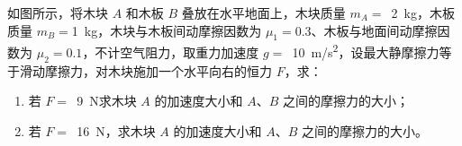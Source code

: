 如图所示，将木块 \(A\) 和木板 \(B\) 叠放在水平地面上，木块质量 \(m_A =\) \,\qty{2}{kg}，木板质量 \(m_B =\)\qty{1}{kg}，木块与木板间动摩擦因数为 \(\mu_1 = 0.3\)、木板与地面间动摩擦因数为 \(\mu_2 = 0.1\)，不计空气阻力，取重力加速度 \(g =\) \,\qty{10}{m/s^2}，设最大静摩擦力等于滑动摩擦力，对木块施加一个水平向右的恒力 \(F\)，求：
\begin{enumerate}
	\item 若 \(F =\) \,\qty{9}{N}求木块 \(A\) 的加速度大小和 \(A\)、\(B\) 之间的摩擦力的大小；
	\item 若 \(F =\) \,\qty{16}{N}，求木块 \(A\) 的加速度大小和 \(A\)、\(B\) 之间的摩擦力的大小。
\end{enumerate}

\begin{answer}
    
\end{answer}